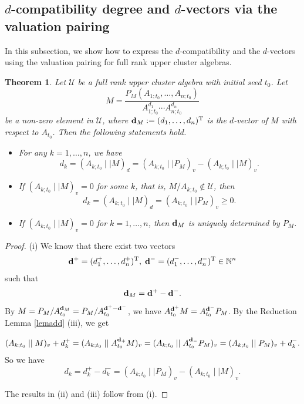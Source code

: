 \documentclass{amsart}
\newtheorem{theorem}{Theorem}[section]
\theoremstyle{definition}
\theoremstyle{remark}
\numberwithin{equation}{section}
\begin{document}
\subsection{\texorpdfstring{$d$}{Lg}-compatibility degree and \texorpdfstring{$d$}{Lg}-vectors via the valuation pairing}\label{sec51}
In this subsection, we show how to express the $d$-compatibility and the $d$-vectors using the valuation pairing for full rank upper cluster algebras.


\begin{theorem}\label{thmind}
 Let $\mathcal U$ be a full rank upper cluster algebra with initial seed $t_0$. Let
 $$M=\frac{P_M(A_{1;t_0},\ldots,A_{n;t_0})}{A_{1;t_0}^{d_1}\cdots A_{n;t_0}^{d_n}}$$ be a non-zero element in $\mathcal U$,  where ${\bf d}_M:=(d_1,\ldots,d_n)^{\rm T}$ is the $d$-vector of $M$ with respect to $A_{t_0}$. Then the following statements hold.
 \begin{itemize}
 \item[(i)] For any $k=1,\ldots,n$, we have $$d_k=(A_{k;t_0}\mid\mid M)_d=(A_{k;t_0}\mid\mid P_M)_v-(A_{k;t_0}\mid\mid M)_v.$$
 \item[(ii)] If $(A_{k;t_0}\mid\mid M)_v=0$ for some $k$, that is, $M/A_{k;t_0}\notin\mathcal U$, then $$d_k=(A_{k;t_0}\mid\mid M)_d=(A_{k;t_0}\mid\mid P_M)_v\geq 0.$$
 \item[(iii)] If $(A_{k;t_0}\mid\mid M)_v=0$ for $k=1,\ldots,n$, then ${\bf d}_M$ is uniquely determined by $P_M$.
 \end{itemize}

\end{theorem}
\begin{proof}(i) We know that there exist two vectors $${\bf d}^+=(d_1^+,\ldots,d_n^+)^{\rm T},\;{\bf d}^-=(d_1^-,\ldots,d_n^-)^{\rm T}\in\mathbb N^n$$ such that $${\bf d}_M={\bf d}^+-{\bf d}^-.$$
By $M=P_M/A_{t_0}^{{\bf d}_M}=P_M/A_{t_0}^{{\bf d}^+-{\bf d}^-}$, we have $A_{t_0}^{{\bf d}^+}M=A_{t_0}^{{\bf d}^-}P_M$.
By the Reduction Lemma \ref{lemadd} (iii), we get

$$(A_{k;t_0}\mid\mid M)_v+d_k^+=(A_{k;t_0}\mid\mid A_{t_0}^{{\bf d}_+}M)_v=(A_{k;t_0}\mid\mid A_{t_0}^{{\bf d}_-}P_M)_v=(A_{k;t_0}\mid\mid P_M)_v+d_k^-.$$
So we have $$d_k=d_k^+-d_k^-=(A_{k;t_0}\mid\mid P_M)_v-(A_{k;t_0}\mid\mid M)_v.$$

The results in (ii) and (iii) follow from (i).
\end{proof}
\end{document}
